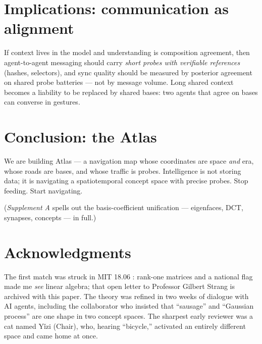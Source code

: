 \documentclass[12pt, a4paper]{article}
\begin{document}
\section{Implications: communication as alignment}
If context lives in the model and understanding is composition agreement, then agent-to-agent messaging should carry \emph{short probes with verifiable references} (hashes, selectors), and sync quality should be measured by posterior agreement on shared probe batteries --- not by message volume. Long shared context becomes a liability to be replaced by shared bases: two agents that agree on bases can converse in gestures.

\section{Conclusion: the Atlas}
We are building Atlas --- a navigation map whose coordinates are space \emph{and} era, whose roads are bases, and whose traffic is probes. Intelligence is not storing data; it is navigating a spatiotemporal concept space with precise probes. Stop feeding. Start navigating.

(\emph{Supplement A} spells out the basis-coefficient unification --- eigenfaces, DCT, synapses, concepts --- in full.)

\section*{Acknowledgments}
The first match was struck in MIT 18.06 \cite{strang}: rank-one matrices and a national flag made me \emph{see} linear algebra; that open letter to Professor Gilbert Strang is archived with this paper. The theory was refined in two weeks of dialogue with AI agents, including the collaborator who insisted that ``sausage'' and ``Gaussian process'' are one shape in two concept spaces. The sharpest early reviewer was a cat named Y\v{i}zi (Chair), who, hearing ``bicycle,'' activated an entirely different space and came home at once.
\end{document}

